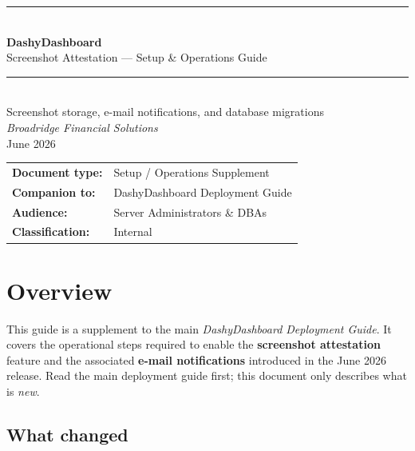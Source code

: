 \documentclass[12pt,a4paper]{report}
\begin{document}
\begin{titlepage}
  \centering
  \vspace*{3cm}
  {\color{broadblue}\rule{\linewidth}{1.5pt}}\\[0.6cm]
  {\Huge\bfseries\color{broadblue} DashyDashboard}\\[0.4cm]
  {\LARGE Screenshot Attestation — Setup \& Operations Guide}\\[0.3cm]
  {\color{broadblue}\rule{\linewidth}{1.5pt}}\\[1cm]
  {\large Screenshot storage, e-mail notifications, and database migrations}\\[2cm]
  {\large\itshape Broadridge Financial Solutions}\\[0.5cm]
  {\large June 2026}\\[3cm]
  \vfill
  {\small
    \begin{tabular}{ll}
      \textbf{Document type:}   & Setup / Operations Supplement \\
      \textbf{Companion to:}    & DashyDashboard Deployment Guide \\
      \textbf{Audience:}        & Server Administrators \& DBAs \\
      \textbf{Classification:}  & Internal \\
    \end{tabular}
  }
\end{titlepage}

\tableofcontents
\clearpage

\chapter{Overview}

This guide is a supplement to the main \emph{DashyDashboard Deployment Guide}. It covers the
operational steps required to enable the \textbf{screenshot attestation} feature and the associated
\textbf{e-mail notifications} introduced in the June 2026 release. Read the main deployment guide
first; this document only describes what is \emph{new}.

\section{What changed}
\end{document}
